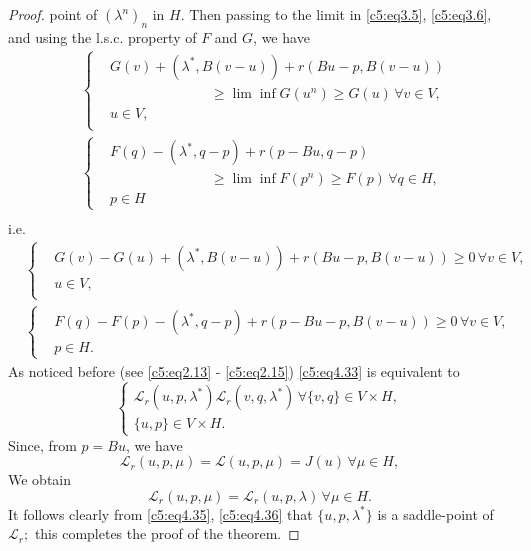 \begin{proof}
point of $(\lambda^n)_n$ in $H$. Then passing to the limit in
\eqref{c5:eq3.5}, \eqref{c5:eq3.6}, and using the l.s.c. property of
$F$ and $G$, we have  
\begin{align*}
&\begin{cases}
&G (v) + (\lambda^*, B (v - u)) + r (Bu - p, B (v - u))\\ 
&   \hspace{3cm}\geq \lim \inf G (u^n) \geq G (u)\, \forall v \in V,\\ 
&u \in V,\\
\end{cases}\\
&\begin{cases}
&F (q) -  (\lambda^*, q - p) + r (p - Bu, q-p)\\ 
   & \hspace{3cm}\geq \lim \inf F (p^n)
   \geq F (p)\, \forall q \in H,\\ 
&p \in H
\end{cases}\\ 
\end{align*}  
i.e.
\begin{align}
&\begin{cases}
&G (v) - G (u) + (\lambda^*, B (v-u)) + r (Bu - p, B (v - u)) \geq 0\, \forall v \in V,\\
&u \in V, \tag{4.33}\label{c5:eq4.33}\\
\end{cases}  \\
&\begin{cases}
&F (q) - F (p) - (\lambda^*, q-p) + r (p- Bu - p, B(v - u)) \geq 0\, \forall v \in V,\\
&p \in H.\tag{4.34}\label{c5:eq4.34}
\end{cases}
\end{align}  
As noticed before (see \eqref{c5:eq2.13} - \eqref{c5:eq2.15}) \eqref{c5:eq4.33} is equivalent to 
\begin{equation}
\begin{cases}
\mathscr{L}_r (u, p, \lambda^*) \mathscr{L}_r (v, q, \lambda^*)\, \forall \{v, q \} \in V \times H, \\
\{u, p \} \in V \times H.\tag{4.35}\label{c5:eq4.35}
\end{cases}
\end{equation} 
  Since, from $p = Bu$, we have 
  $$
  \mathscr{L}_r (u, p, \mu) = \mathscr{L} (u, p, \mu) = J (u)\, \forall \mu \in H,
  $$ 
We obtain
\begin{equation}
\mathscr{L}_r  (u, p, \mu) = \mathscr{L}_r (u, p, \lambda)\, \forall \mu \in H. 
\tag{4.36}\label{c5:eq4.36}
\end{equation}\pageoriginale  
It follows clearly from \eqref{c5:eq4.35}, \eqref{c5:eq4.36} that $\{u, p, \lambda^* \}$ is a saddle-point of $\mathscr{L}_r;$ this completes the proof of the theorem.
\end{proof}

